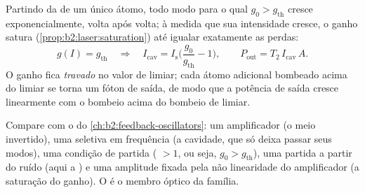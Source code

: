 \begin{proposition}\label{prop:b2:laser:steady}
Partindo da  de um único átomo, todo modo para o
qual $g_0 > g_{\text{th}}$ cresce exponencialmente, volta após volta;
à medida que sua intensidade cresce, o ganho satura
(\cref{prop:b2:laser:saturation}) até igualar exatamente as perdas:
\[
g(I) = g_{\text{th}} \quad\Longrightarrow\quad
I_{\text{cav}} = I_{\text{s}}\Big(\frac{g_0}{g_{\text{th}}} - 1\Big),
\qquad P_{\text{out}} = T_2\,I_{\text{cav}}\,A .
\]
O ganho fica \emph{travado} no valor de limiar; cada átomo adicional
bombeado acima do limiar se torna um fóton de saída, de modo que a potência de saída
cresce linearmente com o bombeio acima do bombeio de limiar.
\end{proposition}

\begin{remark}\label{rem:b2:laser:feedback}
Compare com o  do
\cref{ch:b2:feedback-oscillators}: um amplificador (o meio invertido),
uma  seletiva em frequência (a cavidade, que só deixa passar seus modos),
uma condição de partida ( $> 1$, ou seja, $g_0 > g_{\text{th}}$),
uma partida a partir do ruído (aqui a ) e uma amplitude fixada
pela não linearidade do amplificador (a saturação do ganho). O  é
o membro óptico da família.
\end{remark}

